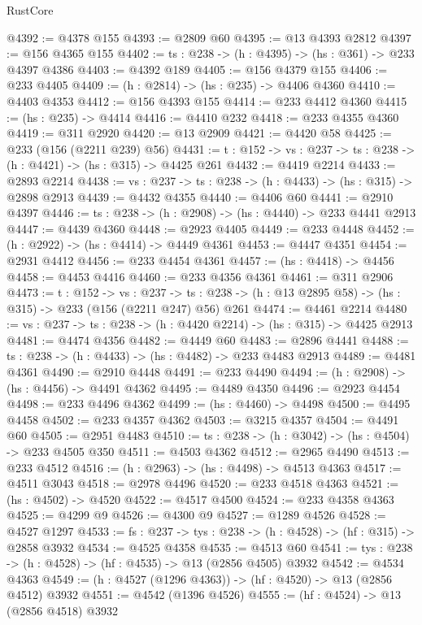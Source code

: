 \begin{lexlean}{RustCore}
\begin{coremodule}
@4392 := @4378 @155
@4393 := @2809 @60
@4395 := @13 @4393 @2812
@4397 := @156 @4365 @155
@4402 := {ts : @238} -> (h : @4395) -> (hs : @361) -> @233 @4397 @4386
@4403 := @4392 @189
@4405 := @156 @4379 @155
@4406 := @233 @4405
@4409 := (h : @2814) -> (hs : @235) -> @4406 @4360
@4410 := @4403 @4353
@4412 := @156 @4393 @155
@4414 := @233 @4412 @4360
@4415 := (hs : @235) -> @4414
@4416 := @4410 @232
@4418 := @233 @4355 @4360
@4419 := @311 @2920
@4420 := @13 @2909
@4421 := @4420 @58
@4425 := @233 (@156 (@2211 @239) @56)
@4431 := {t : @152} -> {vs : @237} -> {ts : @238} -> (h : @4421) -> (hs : @315) -> @4425 @261
@4432 := @4419 @2214
@4433 := @2893 @2214
@4438 := {vs : @237} -> {ts : @238} -> (h : @4433) -> (hs : @315) -> @2898 @2913
@4439 := @4432 @4355
@4440 := @4406 @60
@4441 := @2910 @4397
@4446 := {ts : @238} -> (h : @2908) -> (hs : @4440) -> @233 @4441 @2913
@4447 := @4439 @4360
@4448 := @2923 @4405
@4449 := @233 @4448
@4452 := (h : @2922) -> (hs : @4414) -> @4449 @4361
@4453 := @4447 @4351
@4454 := @2931 @4412
@4456 := @233 @4454 @4361
@4457 := (hs : @4418) -> @4456
@4458 := @4453 @4416
@4460 := @233 @4356 @4361
@4461 := @311 @2906
@4473 := {t : @152} ->
  {vs : @237} ->
  {ts : @238} -> (h : @13 @2895 @58) -> (hs : @315) -> @233 (@156 (@2211 @247) @56) @261
@4474 := @4461 @2214
@4480 := {vs : @237} -> {ts : @238} -> (h : @4420 @2214) -> (hs : @315) -> @4425 @2913
@4481 := @4474 @4356
@4482 := @4449 @60
@4483 := @2896 @4441
@4488 := {ts : @238} -> (h : @4433) -> (hs : @4482) -> @233 @4483 @2913
@4489 := @4481 @4361
@4490 := @2910 @4448
@4491 := @233 @4490
@4494 := (h : @2908) -> (hs : @4456) -> @4491 @4362
@4495 := @4489 @4350
@4496 := @2923 @4454
@4498 := @233 @4496 @4362
@4499 := (hs : @4460) -> @4498
@4500 := @4495 @4458
@4502 := @233 @4357 @4362
@4503 := @3215 @4357
@4504 := @4491 @60
@4505 := @2951 @4483
@4510 := {ts : @238} -> (h : @3042) -> (hs : @4504) -> @233 @4505 @350
@4511 := @4503 @4362
@4512 := @2965 @4490
@4513 := @233 @4512
@4516 := (h : @2963) -> (hs : @4498) -> @4513 @4363
@4517 := @4511 @3043
@4518 := @2978 @4496
@4520 := @233 @4518 @4363
@4521 := (hs : @4502) -> @4520
@4522 := @4517 @4500
@4524 := @233 @4358 @4363
@4525 := @4299 @9
@4526 := @4300 @9
@4527 := @1289 @4526
@4528 := @4527 @1297
@4533 := {fs : @237} -> {tys : @238} -> (h : @4528) -> (hf : @315) -> @2858 @3932
@4534 := @4525 @4358
@4535 := @4513 @60
@4541 := {tys : @238} -> (h : @4528) -> (hf : @4535) -> @13 (@2856 @4505) @3932
@4542 := @4534 @4363
@4549 := (h : @4527 (@1296 @4363)) -> (hf : @4520) -> @13 (@2856 @4512) @3932
@4551 := @4542 (@1396 @4526)
@4555 := (hf : @4524) -> @13 (@2856 @4518) @3932

\end{coremodule}
\end{lexlean}
